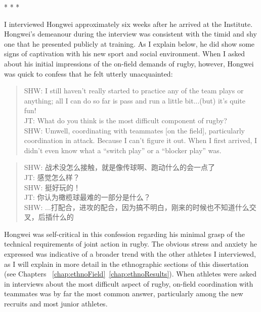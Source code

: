 \begin{CJK}{UTF8}{gbsn}
                        \begin{center}
                          * * *
                        \end{center}

I interviewed Hongwei approximately six weeks after he arrived at the Institute.  Hongwei's demeanour during the interview was consistent with the timid and shy one that he presented publicly at training.  As I explain below, he did show some signs of captivation with his new sport and social environment.  When I asked about his initial impressions of the on-field demands of rugby, however, Hongwei was quick to confess that he felt utterly unacquainted:

  \begin{quote}
    SHW: I still haven’t really started to practice any of the team plays or anything; all I can do so far is pass and run a little bit...(but) it's quite fun! \\
    JT: What do you think is the most difficult component of rugby? \\
    SHW: Um\textellipsis well, coordinating with teammates [on the field], particularly coordination in attack.  Because I can't figure it out.  When I first arrived, I didn’t even know what a ``switch play'' or a ``blocker play'' was.
  \end{quote}

  \begin{quote}
    SHW: 战术没怎么接触，就是像传球啊、跑动什么的会一点了 \\
    JT: 感觉怎么样？\\
    SHW: 挺好玩的！\\
    JT: 你认为橄榄球最难的一部分是什么？ \\
    SHW: ...打配合，进攻的配合，因为搞不明白，刚来的时候也不知道什么交叉，后插什么的 \\
  \end{quote}

Hongwei was self-critical in this confession regarding his minimal grasp of the technical requirements of joint action in rugby.  The obvious stress and anxiety he expressed was indicative of a broader trend with the other athletes I interviewed, as I will explain in more detail in the ethnographic sections of this dissertation (see Chapters ~\ref{chap:ethnoField}\nobreakdash~\ref{chap:ethnoResults}). When athletes were asked in interviews about the most difficult aspect of rugby, on-field coordination with teammates was by far the most common answer, particularly among the new recruits and most junior athletes.


\end{CJK}
